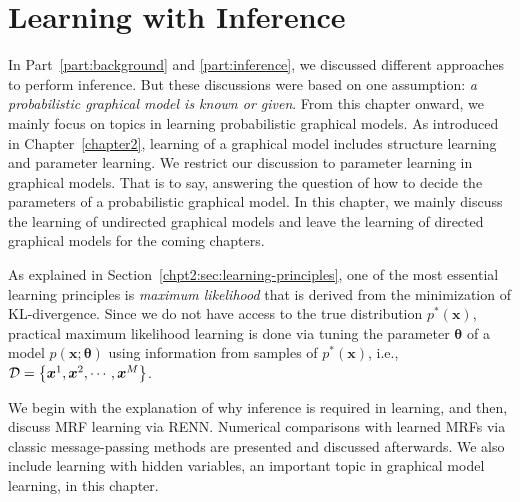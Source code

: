 \chapter{Learning with Inference}
\label{chpt5:undirecteLearning}
In Part~\ref{part:background} and \ref{part:inference}, we discussed different approaches to perform inference. But these discussions were based on one assumption: \textit{a probabilistic graphical model is known or given}. From this chapter onward, we mainly focus on topics in learning probabilistic graphical models.
As introduced in Chapter~\ref{chapter2}, learning of a graphical model includes structure learning and parameter learning. We restrict our discussion to parameter learning in graphical models. That is to say, answering the question of how to decide the parameters of a probabilistic graphical model.
In this chapter, we mainly discuss the learning of undirected graphical models and leave the learning of directed graphical models for the coming chapters.

As explained in Section~\ref{chpt2:sec:learning-principles}, one of the most essential learning principles is \textit{maximum likelihood} that is derived from the minimization of KL-divergence. Since we do not have access to the true distribution $p^{\ast}(\bm{x})$, practical maximum likelihood learning is done via tuning the parameter $\bm{\theta}$ of a model $p(\bm{x};\bm{\theta})$ using information from samples of $p^{\ast}(\bm{x})$, i.e., $\mathcal{D} = \left\{ \bm{x}^1, \bm{x}^2, \cdots, \bm{x}^{M}\right\}$.

We begin with the explanation of why inference is required in learning, and then, discuss MRF learning via RENN. Numerical comparisons with learned MRFs via classic message-passing methods are presented and discussed afterwards. We also include learning with hidden variables, an important topic in graphical model learning, in this chapter.



